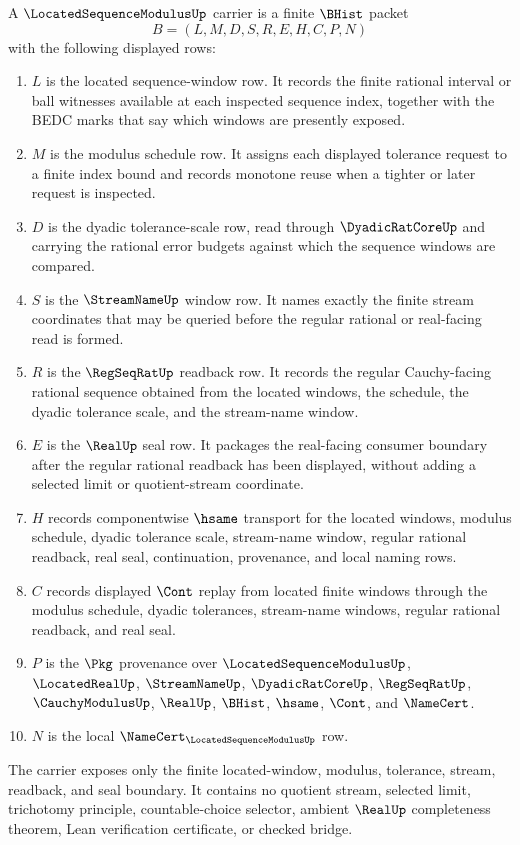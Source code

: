 \begin{definition}
\label{def:located-sequence-modulus-carrier}
A $\LocatedSequenceModulusUp$ carrier is a finite $\BHist$ packet
$$
B=(L,M,D,S,R,E,H,C,P,N)
$$
with the following displayed rows:
\begin{enumerate}
\item $L$ is the located sequence-window row. It records the finite rational interval or ball witnesses available at each inspected sequence index, together with the BEDC marks that say which windows are presently exposed.
\item $M$ is the modulus schedule row. It assigns each displayed tolerance request to a finite index bound and records monotone reuse when a tighter or later request is inspected.
\item $D$ is the dyadic tolerance-scale row, read through $\DyadicRatCoreUp$ and carrying the rational error budgets against which the sequence windows are compared.
\item $S$ is the $\StreamNameUp$ window row. It names exactly the finite stream coordinates that may be queried before the regular rational or real-facing read is formed.
\item $R$ is the $\RegSeqRatUp$ readback row. It records the regular Cauchy-facing rational sequence obtained from the located windows, the schedule, the dyadic tolerance scale, and the stream-name window.
\item $E$ is the $\RealUp$ seal row. It packages the real-facing consumer boundary after the regular rational readback has been displayed, without adding a selected limit or quotient-stream coordinate.
\item $H$ records componentwise $\hsame$ transport for the located windows, modulus schedule, dyadic tolerance scale, stream-name window, regular rational readback, real seal, continuation, provenance, and local naming rows.
\item $C$ records displayed $\Cont$ replay from located finite windows through the modulus schedule, dyadic tolerances, stream-name windows, regular rational readback, and real seal.
\item $P$ is the $\Pkg$ provenance over $\LocatedSequenceModulusUp$, $\LocatedRealUp$, $\StreamNameUp$, $\DyadicRatCoreUp$, $\RegSeqRatUp$, $\CauchyModulusUp$, $\RealUp$, $\BHist$, $\hsame$, $\Cont$, and $\NameCert$.
\item $N$ is the local $\NameCert_{\LocatedSequenceModulusUp}$ row.
\end{enumerate}
The carrier exposes only the finite located-window, modulus, tolerance, stream, readback, and seal boundary. It contains no quotient stream, selected limit, trichotomy principle, countable-choice selector, ambient $\RealUp$ completeness theorem, Lean verification certificate, or checked bridge.
\end{definition}

